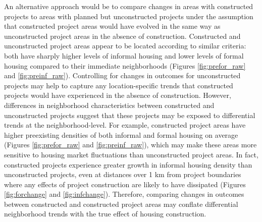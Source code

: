 \documentclass[12pt]{article}
\begin{document}
An alternative approach would be to compare changes in areas with constructed projects to areas with planned but unconstructed projects under the assumption that constructed project areas would have evolved in the same way as unconstructed project areas in the absence of construction.  Constructed and unconstructed project areas appear to be located according to similar criteria: both have sharply higher levels of informal housing and lower levels of formal housing compared to their immediate neighborhoods (Figures \ref{fig:prefor_raw} and \ref{fig:preinf_raw}).  Controlling for changes in outcomes for unconstructed projects may help to capture any location-specific trends that constructed projects would have experienced in the absence of construction.  However,  differences in neighborhood characteristics between constructed and unconstructed projects suggest that these projects may be exposed to differential trends at the neighborhood-level.  For example, constructed project areas have higher preexisting densities of both informal and formal housing on average (Figures \ref{fig:prefor_raw} and \ref{fig:preinf_raw}), which may make these areas more sensitive to housing market fluctuations than unconstructed project areas.  In fact, constructed projects experience greater growth in informal housing density than unconstructed projects, even at distances over 1 km from project boundaries where any effects of project construction are likely to have dissipated (Figures \ref{fig:forchange} and \ref{fig:infchange}).  Therefore, comparing changes in outcomes between constructed and constructed project areas may conflate differential neighborhood trends with the true effect of housing construction.

\end{document}
